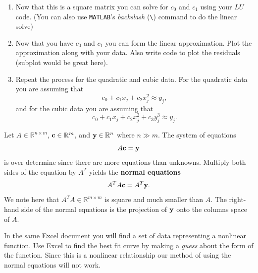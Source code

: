 \begin{problem}
\begin{enumerate}
        \item Now that this is a square matrix you can solve for $c_0$ and $c_1$ using
            your $LU$ code. (You can also use \texttt{MATLAB}'s {\it backslash} (\verb|\|) command to
            do the linear solve)
        \item Now that you have $c_0$ and $c_1$ you can form the linear approximation.
            Plot the approximation along with your data.  Also write code to plot the
            residuals (subplot would be great here).
        \item Repeat the process for the quadratic and cubic data.  For the quadratic data
            you are assuming that 
            \[ c_0 + c_1 x_j + c_2 x_j^2 \approx y_j, \]
            and for the cubic data you are assuming that 
            \[ c_0 + c_1 x_j + c_2 x_j^2 + c_3 y_j^3 \approx y_j. \]
    \end{enumerate}
\end{problem}


\begin{definition}
    Let $A \in \mathbb{R}^{n \times m}$, ${\bf c} \in \mathbb{R}^{m}$, and ${\bf y} \in
    \mathbb{R}^n$ where $n \gg m$.  The system of equations
    \[ A {\bf c} = {\bf y} \]
    is over determine since there are more equations than unknowns.  Multiply both sides
    of the equation by $A^T$ yields the {\bf normal equations}
    \[ A^T A {\bf c} = A^T {\bf y}. \]
    We note here that $A^T A \in \mathbb{R}^{m \times m}$ is square and much smaller than
    $A$.  The right-hand side of the normal equations is the projection of ${\bf y}$ onto the
    columns space of $A$.  
\end{definition}

\begin{problem}
    In the same Excel document you will find a set of data representing a nonlinear
    function.  Use Excel to find the best fit curve by making a {\it guess} about the form
    of the function.  Since this is a nonlinear relationship our method of using the
    normal equations will not work.
\end{problem}

